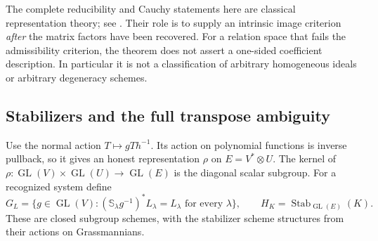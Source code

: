 \documentclass[11pt,reqno]{amsart}
\numberwithin{equation}{section}
\theoremstyle{definition}\newtheorem{definition}[theorem]{Definition}
\theoremstyle{remark}\newtheorem{remark}[theorem]{Remark}
\begin{document}
The complete reducibility and Cauchy statements here are classical
representation theory; see \cite{ChengWang}.  Their role is to
supply an intrinsic image criterion \emph{after} the matrix factors
have been recovered.  For a relation space that fails the
admissibility criterion, the theorem does not assert a one-sided
coefficient description.  In particular it is not a classification
of arbitrary homogeneous ideals or arbitrary degeneracy schemes.

\subsection{Stabilizers and the full transpose ambiguity}
Use the normal action \(T\mapsto gTh^{-1}\).  Its action on
polynomial functions is inverse pullback, so it gives an honest
representation \(\rho\) on \(E=V^*\otimes U\).
The kernel of \(\rho:\operatorname{GL}(V)\times
\operatorname{GL}(U)\to\operatorname{GL}(E)\) is the diagonal
scalar subgroup.  For a recognized system define
\[
 G_L=\{g\in\operatorname{GL}(V):
          (\mathbb S_\lambda g^{-1})^*L_\lambda=L_\lambda
                                      \text{ for every }\lambda\},
 \qquad H_K=\operatorname{Stab}_{\operatorname{GL}(E)}(K).
\]
These are closed subgroup schemes, with the stabilizer scheme
structures from their actions on Grassmannians.
\end{document}
